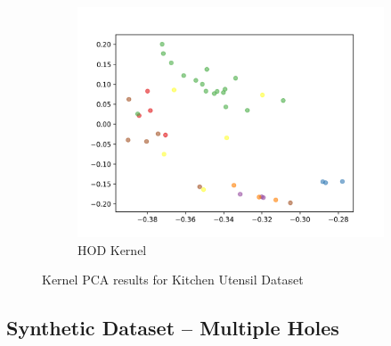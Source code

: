 \documentclass[10pt]{article}
\begin{document}
\begin{figure}[H]
\begin{subfigure}[h]{0.33\textwidth}
        \includegraphics[width=\linewidth]{DB_hod}
        \caption{HOD Kernel}
    \end{subfigure}%
    \caption{Kernel PCA results for Kitchen Utensil Dataset}
    \label{fig:db_kernels}
\end{figure}

\subsection{Synthetic Dataset -- Multiple Holes}
\end{document}
